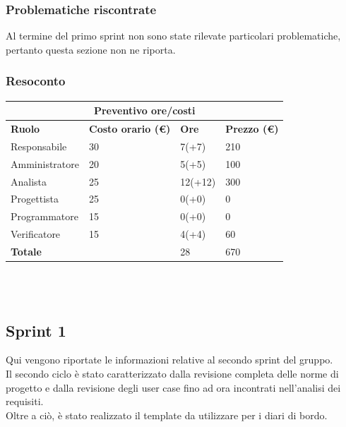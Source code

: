 \documentclass[12pt]{article}
\begin{document}
\subsubsection{Problematiche riscontrate}
Al termine del primo sprint non sono state rilevate particolari problematiche, pertanto questa sezione non ne riporta.
\subsubsection{Resoconto}
\begin{center}
	\begin{tabularx}{\textwidth}{|X|X|X|X|}
		\hline
		\multicolumn{4}{|c|}{\textbf{Preventivo ore/costi}}                                      \\
		\hline
		\hline
		\textbf{Ruolo}  & \textbf{Costo orario (\euro)} & \textbf{Ore} & \textbf{Prezzo (\euro)} \\
		\hline
		Responsabile    & 30                            & 7(+7)        & 210                     \\
		\hline
		Amministratore  & 20                            & 5(+5)        & 100                     \\
		\hline
		Analista        & 25                            & 12(+12)      & 300                     \\
		\hline
		Progettista     & 25                            & 0(+0)        & 0                       \\
		\hline
		Programmatore   & 15                            & 0(+0)        & 0                       \\
		\hline
		Verificatore    & 15                            & 4(+4)        & 60                      \\
		\hline
		\hline
		\textbf{Totale} &                               & 28           & 670                     \\
		\hline
	\end{tabularx}\\[8pt]
	\mbox{}\\
\end{center}


\subsection{Sprint 1}
Qui vengono riportate le informazioni relative al secondo sprint del gruppo. \\
Il secondo ciclo è stato caratterizzato dalla revisione completa delle norme di progetto e dalla revisione degli user case fino ad ora incontrati nell'analisi dei requisiti.\\
Oltre a ciò, è stato realizzato il template da utilizzare per i diari di bordo.
\end{document}
